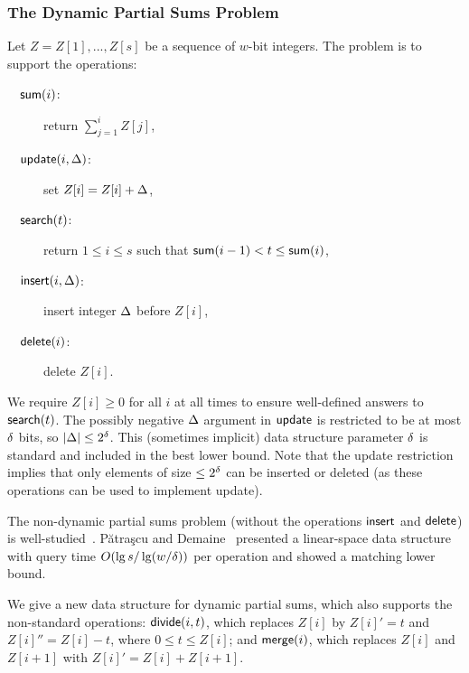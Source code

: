 \subsubsection{The Dynamic Partial Sums Problem} Let $Z=Z[1],...,Z[s]$ be a sequence of $w$-bit integers. The problem is to support the operations:
\begin{description}
 \item[$\quad\mathsf{sum}(i)$:] return $\sum_{j=1}^i Z[j]$,
 \item[$\quad\mathsf{update}(i, \Delta)$:] set $Z[i] = Z[i] + \Delta$,
 \item[$\quad\mathsf{search}(t)$:] return $1 \leq i \leq s$ such that $\mathsf{sum}(i-1) < t \leq \mathsf{sum}(i)$,
 \item[$\quad\mathsf{insert}(i, \Delta)$:] insert integer $\Delta$ before $Z[i]$,
 \item[$\quad\mathsf{delete}(i)$:] delete $Z[i]$.
 \end{description}
We require $Z[i] \geq 0$ for all $i$ at all times to ensure well-defined answers to $\mathsf{search}(t)$. 
The possibly negative $\Delta$ argument in $\mathsf{update}$ is restricted to be at most $\delta$ bits, so $|\Delta| \leq 2^\delta$. 
This (sometimes implicit) data structure parameter $\delta$ is standard and included in the best lower bound. Note that the update restriction implies that only elements of size $\leq 2^\delta$ can be inserted or deleted (as these operations can be used to implement update).

The non-dynamic partial sums problem (without the operations $\mathsf{insert}$ and $\mathsf{delete}$) is well-studied~\cite{dietz1989optimal,raman2001succinct, husfeldt2003new,fredman1989cell,hon2011a,husfeldt1996lower,fenwick1994new,puaatracscu2004tight}. Pătraşcu and Demaine~\cite{puaatracscu2004tight} presented a linear-space data structure with query time $O(\lg s / \lg (w / \delta))$ per operation and showed a matching lower bound.

We give a new data structure for dynamic partial sums, which also supports the non-standard operations: $\mathsf{divide}(i, t)$, which replaces $Z[i]$ by $Z[i]' = t$ and $Z[i]'' = Z[i] - t$, where $0 \leq t \leq Z[i]$; and $\mathsf{merge}(i)$, which replaces $Z[i]$ and $Z[i+1]$ with $Z[i]' = Z[i] + Z[i+1]$.

